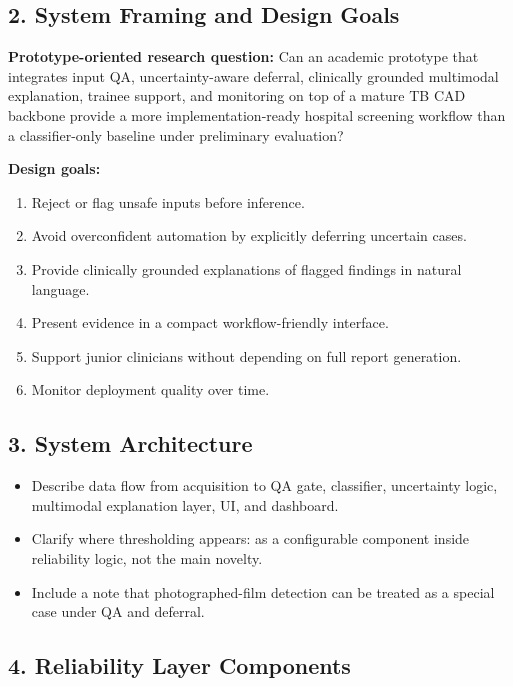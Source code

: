 \documentclass[11pt]{article}
\begin{document}
\subsection{2. System Framing and Design Goals}

\textbf{Prototype-oriented research question:} Can an academic prototype that integrates input QA, uncertainty-aware deferral, clinically grounded multimodal explanation, trainee support, and monitoring on top of a mature TB CAD backbone provide a more implementation-ready hospital screening workflow than a classifier-only baseline under preliminary evaluation?

\textbf{Design goals:}
\begin{enumerate}[leftmargin=1.8em]
    \item Reject or flag unsafe inputs before inference.
    \item Avoid overconfident automation by explicitly deferring uncertain cases.
    \item Provide clinically grounded explanations of flagged findings in natural language.
    \item Present evidence in a compact workflow-friendly interface.
    \item Support junior clinicians without depending on full report generation.
    \item Monitor deployment quality over time.
\end{enumerate}

\subsection{3. System Architecture}

\begin{itemize}[leftmargin=1.5em]
    \item Describe data flow from acquisition to QA gate, classifier, uncertainty logic, multimodal explanation layer, UI, and dashboard.
    \item Clarify where thresholding appears: as a configurable component inside reliability logic, not the main novelty.
    \item Include a note that photographed-film detection can be treated as a special case under QA and deferral.
\end{itemize}

\subsection{4. Reliability Layer Components}
\end{document}
